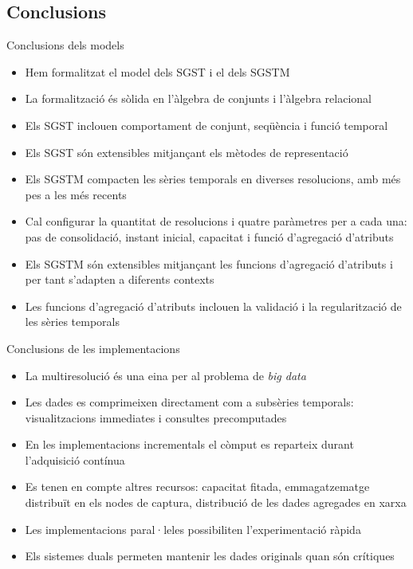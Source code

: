 \subsection*{Conclusions}
\begin{frame}{Conclusions dels models}

  \begin{itemize}
  \item Hem formalitzat el model dels SGST i el dels SGSTM
  \item La formalització és sòlida en l’àlgebra de conjunts i l’àlgebra relacional

\item Els SGST inclouen comportament de conjunt, seqüència i funció temporal
\item Els SGST són extensibles mitjançant els mètodes de representació
\item Els SGSTM compacten les sèries temporals en diverses resolucions, amb més pes a les més recents
\item Cal configurar la quantitat de resolucions i quatre paràmetres per a cada una: pas de consolidació, instant inicial, capacitat i funció d’agregació d’atributs
\item Els SGSTM són extensibles mitjançant les funcions d’agregació d’atributs i per tant s’adapten a diferents contexts
\item Les funcions d’agregació d’atributs inclouen la validació i la regularització de les sèries temporals

  \end{itemize}


\end{frame}

\begin{frame}{Conclusions de les implementacions}
  \begin{itemize}
\item La multiresolució és una eina per al problema de \emph{big data}
\item Les dades es comprimeixen directament com a subsèries temporals: visualitzacions immediates i consultes precomputades
\item En les implementacions incrementals el còmput es reparteix durant l’adquisició contínua
\item Es tenen en compte altres recursos: capacitat fitada, emmagatzematge distribuït en els nodes de captura, distribució de les dades agregades en xarxa
\item Les implementacions paral·leles possibiliten l’experimentació ràpida
\item Els sistemes duals permeten mantenir les dades originals quan són crítiques
  \end{itemize}
\end{frame}

